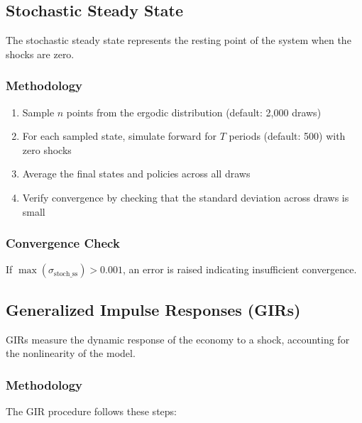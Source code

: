 \documentclass[11pt]{article}
\begin{document}
\subsection{Stochastic Steady State}

The stochastic steady state represents the resting point of the system when the shocks are zero.

\subsubsection{Methodology}
\begin{enumerate}
    \item Sample $n$ points from the ergodic distribution (default: 2,000 draws)
    \item For each sampled state, simulate forward for $T$ periods (default: 500) with zero shocks
    \item Average the final states and policies across all draws
    \item Verify convergence by checking that the standard deviation across draws is small
\end{enumerate}

\subsubsection{Convergence Check}
If $\max(\sigma_{\text{stoch\_ss}}) > 0.001$, an error is raised indicating insufficient convergence.

\subsection{Generalized Impulse Responses (GIRs)}

GIRs measure the dynamic response of the economy to a shock, accounting for the nonlinearity of the model.

\subsubsection{Methodology}

The GIR procedure follows these steps:
\end{document}
